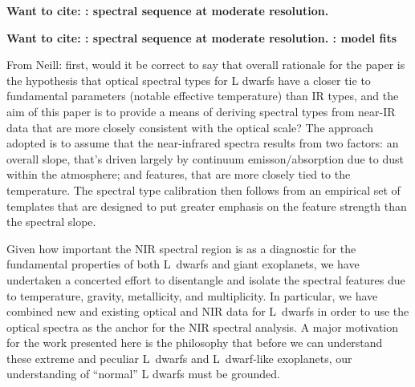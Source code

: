 \documentclass[12pt,preprint]{aastex}
\begin{document}


\textbf{Want to cite: \citet{Cushing05}: spectral sequence at moderate resolution.
}

\textbf{Want to cite: \citet{Cushing05}: spectral sequence at moderate resolution. \citet{Cushing08, Witte11}: model fits
}

From Neill:
first, would it be correct to say that overall rationale for the paper is the hypothesis that optical spectral types for L dwarfs have a closer tie to fundamental parameters (notable effective temperature) than IR types, and the aim of this paper is to provide a means of deriving spectral types from near-IR data that are more closely consistent with the optical scale? The approach adopted is to assume that the near-infrared spectra results from two factors: an overall slope, that's driven largely by continuum emisson/absorption due to dust within the atmosphere; and features, that are more closely tied to the temperature. The spectral type calibration then follows from an empirical set of templates that are designed to put greater emphasis on the feature strength than the spectral slope.

Given how important the NIR spectral region is as a diagnostic for the fundamental properties of both L~dwarfs and giant exoplanets, we have undertaken a concerted effort to disentangle and isolate the spectral features due to temperature, gravity, metallicity, and multiplicity. In particular, we have combined new and existing optical and NIR data for L~dwarfs in order to use the optical spectra as the anchor for the NIR spectral analysis. 
A major motivation for the work presented here is the philosophy that before we can understand these extreme and peculiar L~dwarfs and L~dwarf-like exoplanets, our understanding of ``normal'' L dwarfs must be grounded. 
\end{document}
